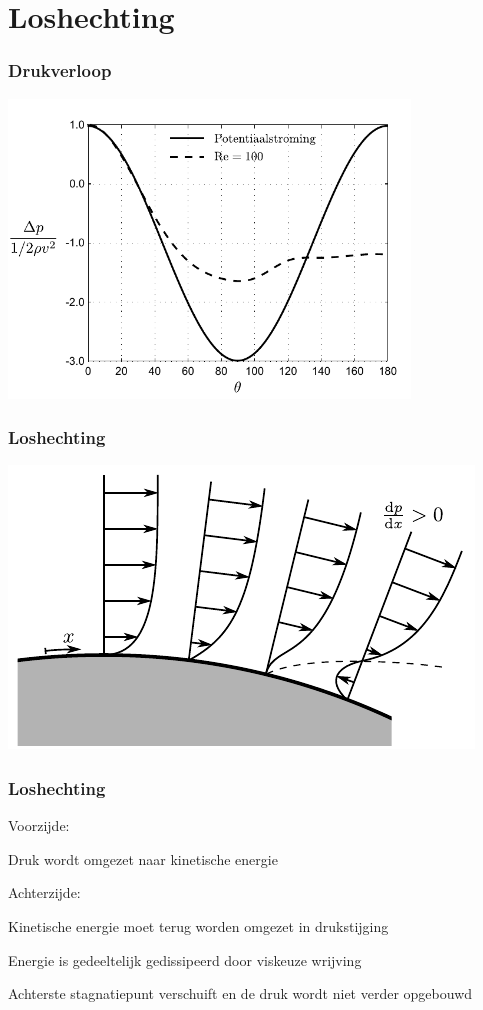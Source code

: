 \documentclass[t]{beamer}
\begin{document}
	\section{Loshechting}
	\begin{frame}
		\frametitle{Drukverloop}
		\pause
		\center
		\includegraphics[width=0.8\textwidth]{../fig/uitwendige_stroming/Cilinderstroming_drukverloop}
  	\end{frame}
  	\begin{frame}
		\frametitle{Loshechting}
		\pause
		\center
		\includegraphics{../fig/uitwendige_stroming/loshechting}
  	\end{frame}
  	\begin{frame}
		\frametitle{Loshechting}
		Voorzijde:
		\begin{center}
			Druk wordt omgezet naar kinetische energie
		\end{center}
		
		\vspace{0.5cm}
		\pause
		Achterzijde:
		\begin{center}
			Kinetische energie moet terug worden omgezet in drukstijging
			
			\vspace{0.5cm}
			\pause
			Energie is gedeeltelijk gedissipeerd door viskeuze wrijving
			
			\vspace{0.5cm}
			\pause
			Achterste stagnatiepunt verschuift en de druk wordt niet verder opgebouwd
		\end{center}
  	\end{frame}
\end{document}
